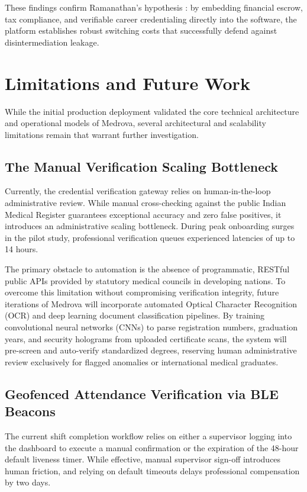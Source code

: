 \documentclass[conference]{IEEEtran}
\begin{document}
These findings confirm Ramanathan's hypothesis \cite{ramanathan2023switching}: by embedding financial escrow, tax compliance, and verifiable career credentialing directly into the software, the platform establishes robust switching costs that successfully defend against disintermediation leakage.

\section{Limitations and Future Work}
While the initial production deployment validated the core technical architecture and operational models of Medrova, several architectural and scalability limitations remain that warrant further investigation.

\subsection{The Manual Verification Scaling Bottleneck}
Currently, the credential verification gateway relies on human-in-the-loop administrative review. While manual cross-checking against the public Indian Medical Register \cite{nmc2023register} guarantees exceptional accuracy and zero false positives, it introduces an administrative scaling bottleneck. During peak onboarding surges in the pilot study, professional verification queues experienced latencies of up to 14 hours. 

The primary obstacle to automation is the absence of programmatic, RESTful public APIs provided by statutory medical councils in developing nations. To overcome this limitation without compromising verification integrity, future iterations of Medrova will incorporate automated Optical Character Recognition (OCR) and deep learning document classification pipelines. By training convolutional neural networks (CNNs) to parse registration numbers, graduation years, and security holograms from uploaded certificate scans, the system will pre-screen and auto-verify standardized degrees, reserving human administrative review exclusively for flagged anomalies or international medical graduates.

\subsection{Geofenced Attendance Verification via BLE Beacons}
The current shift completion workflow relies on either a supervisor logging into the dashboard to execute a manual confirmation or the expiration of the 48-hour default liveness timer. While effective, manual supervisor sign-off introduces human friction, and relying on default timeouts delays professional compensation by two days.
\end{document}
